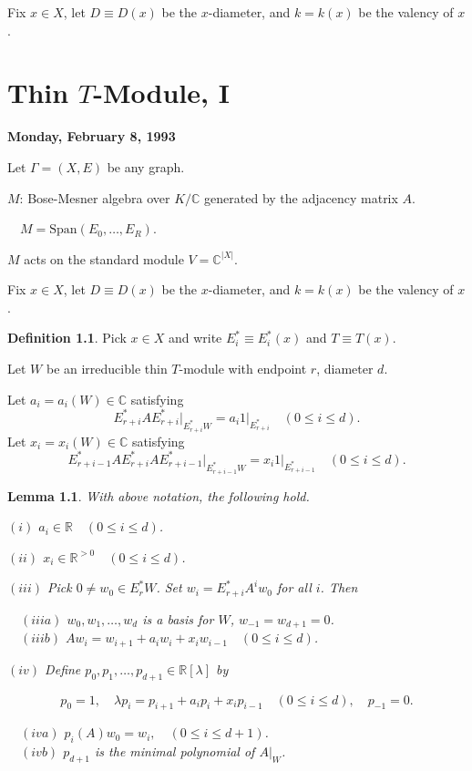 \documentclass[
]{book}
\newtheorem{lemma}{Lemma}[chapter]
\theoremstyle{definition}
\newtheorem{definition}{Definition}[chapter]
\theoremstyle{definition}
\theoremstyle{definition}
\theoremstyle{definition}
\theoremstyle{remark}
\begin{document}
Fix \(x\in X\), let
\(D \equiv D(x)\) be the \(x\)-diameter, and \(k = k(x)\) be the valency of \(x\).

\hypertarget{lec9}{%
\chapter{\texorpdfstring{Thin \(T\)-Module, I}{Thin T-Module, I}}\label{lec9}}

\textbf{Monday, February 8, 1993}

Let \(\Gamma = (X, E)\) be any graph.

\(M\): Bose-Mesner algebra over \(K/\mathbb{C}\) generated by the adjacency matrix \(A\).

\(\quad M = \mathrm{Span}(E_0, \ldots, E_R)\).

\(M\) acts on the standard module \(V = \mathbb{C}^{|X|}\).

Fix \(x\in X\), let
\(D \equiv D(x)\) be the \(x\)-diameter, and \(k = k(x)\) be the valency of \(x\).

\begin{definition}
Pick \(x\in X\) and write \(E_i^* \equiv E_i^*(x)\) and \(T \equiv T(x)\).

Let \(W\) be an irreducible thin \(T\)-module with endpoint \(r\), diameter \(d\).

Let \(a_i = a_i(W)\in \mathbb{C}\) satisfying
\[E_{r+i}^*A{E^*_{r+i}|}_{E_{r+i}^*W} = a_i1|_{E_{r+i}^*} \quad (0\leq i\leq d).\]
Let \(x_i = x_i(W)\in \mathbb{C}\) satisfying
\[E_{r+i-1}^*A{E^*_{r+i}AE^*_{r+i-1}|}_{E_{r+i-1}^*W} = x_i1|_{E_{r+i-1}^*} \quad (0\leq i\leq d).\]
\end{definition}

\begin{lemma}
\protect\hypertarget{lem:thin-module-structure}{}\label{lem:thin-module-structure}With above notation, the following hold.

\((i)\) \(a_i\in \mathbb{R} \quad (0\leq i\leq d)\).

\((ii)\) \(x_i\in \mathbb{R}^{>0} \quad (0\leq i\leq d)\).

\((iii)\) Pick \(0\neq w_0\in E^*_rW\). Set \(w_i = E^*_{r+i}A^iw_0\) for all \(i\). Then

\(\quad (iiia)\) \(w_0, w_1, \ldots, w_d\) is a basis for \(W\), \(w_{-1} = w_{d+1} = 0\).\\
\(\quad (iiib)\) \(Aw_i = w_{i+1} + a_iw_{i} + x_iw_{i-1} \quad (0\leq i\leq d)\).

\((iv)\) Define \(p_0, p_1, \ldots, p_{d+1}\in \mathbb{R}[\lambda]\) by

\[p_0 = 1, \quad \lambda p_i = p_{i+1} + a_i p_i + x_i p_{i-1} \quad (0\leq i\leq d),\quad p_{-1} = 0.\]

\(\quad (iva)\) \(p_i(A)w_0 = w_i, \quad (0\leq i\leq d+1)\).\\
\(\quad (ivb)\) \(p_{d+1}\) is the minimal polynomial of \(A|_W\).
\end{lemma}
\end{document}
